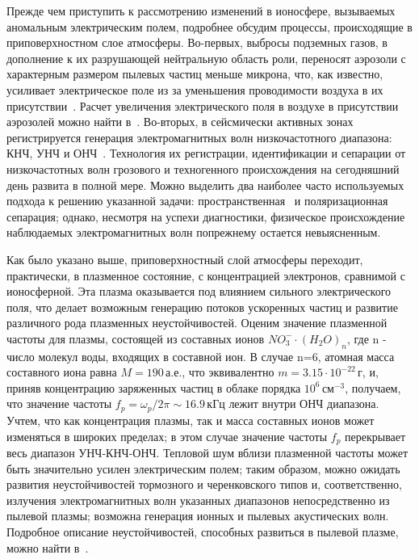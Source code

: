 \documentclass[12pt, oneside, a4paper]{article}
\begin{document}
Прежде чем приступить к рассмотрению изменений в ионосфере, вызываемых аномальным электрическим полем,  подробнее обсудим  процессы, происходящие в приповерхностном слое атмосферы. Во-первых, выбросы подземных газов, в дополнение к их разрушающей нейтральную область роли, переносят аэрозоли с характерным размером пылевых частиц меньше микрона, что, как известно, усиливает электрическое поле из за уменьшения проводимости воздуха в их присутствии~\cite{Krider_Roble:1986}. Расчет увеличения электрического поля в воздухе в присутствии аэрозолей можно найти в~\cite{Pulinets:2000}. Во-вторых, в сейсмически активных зонах регистрируется генерация электромагнитных волн низкочастотного диапазона: КНЧ, УНЧ и ОНЧ~\cite{Nagao:2002}.  Технология их регистрации, идентификации и сепарации от низкочастотных волн грозового и техногенного происхождения на сегодняшний день развита в полной мере. Можно выделить два наиболее часто используемых подхода к решению указанной задачи: пространственная~\cite{Ismaguilov:2001} и поляризационная~\cite{Hattori:2002} сепарация; однако, несмотря на успехи диагностики, физическое происхождение наблюдаемых электромагнитных волн попрежнему остается невыясненным. 

Как было указано выше, приповерхностный слой атмосферы переходит, практически, в плазменное состояние, с концентрацией электронов, сравнимой с ионосферной.  Эта плазма оказывается под влиянием сильного электрического поля, что делает возможным генерацию потоков ускоренных частиц и развитие различного рода плазменных неустойчивостей. Оценим значение плазменной частоты для плазмы, состоящей из составных ионов $NO^-_3\cdot{}(H_2O)_n$, где n - число молекул воды, входящих в составной ион. В случае n=6, атомная масса составного иона равна $M=190$\,а.е., что эквивалентно $m=3.15\cdot{}10^{-22}$\,г, и, приняв концентрацию заряженных частиц в облаке порядка $10^6$\,см$^{-3}$, получаем, что значение частоты $f_p=\omega_p/2\pi\sim{}16.9$\,кГц лежит внутри ОНЧ диапазона. Учтем, что как концентрация плазмы, так и масса составных ионов может изменяться в широких пределах; в этом случае значение частоты $f_p$ перекрывает весь диапазон УНЧ-КНЧ-ОНЧ. Тепловой шум вблизи плазменной частоты может быть значительно усилен электрическим полем; таким образом, можно ожидать развития неустойчивостей тормозного и черенковского типов и, соответственно, излучения электромагнитных волн указанных диапазонов непосредственно из пылевой плазмы; возможна генерация ионных и пылевых акустических волн. Подробное описание неустойчивостей, способных развиться в пылевой плазме, можно найти в~\cite{Kikuchi:2001}. 
\end{document}
